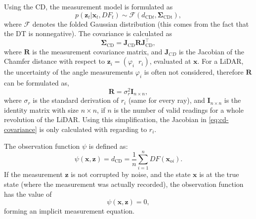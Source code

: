 Using the CD, the measurement model is formulated as
\begin{equation}
    p(\mathbf{\mathbf{z}}_t | \mathbf{x}_t, DF_t) \sim \mathcal{F}(d_{\text{CD}t},\boldsymbol\Sigma_{\text{CDt}}),
\end{equation}
where $\mathcal{F}$ denotes the folded Gaussian distribution (this comes from the fact that the DT is nonnegative).
The covariance is calculated as
\begin{equation}\label{eq:cd-covariance}
    \boldsymbol\Sigma_{\text{CD}} = \mathbf{J}_{\text{CD}}\mathbf{R}\mathbf{J}_{\text{CD}}^{\top},
\end{equation}
where $\mathbf{R}$ is the measurement covariance matrix, and $\mathbf{J}_{CD}$ is the Jacobian of the
Chamfer distance with respect to $\mathbf{z}_i = (\varphi_i\;\;r_i)$,
evaluated at $\mathbf{x}$.
For a LiDAR, the uncertainty of the angle measurements $\varphi_i$ is often not considered,
therefore $\mathbf{R}$ can be formulated as,
\begin{equation}\label{eq:lidar-meas-covar}
    \mathbf{R} = \sigma_r^{2}\mathbf{I}_{n\times n},
\end{equation}
where $\sigma_r$ is the standard derivation of $r_i$ (same for every ray),
and $\mathbf{I}_{n\times n}$ is the identity matrix with size $n\times n$,
if $n$ is the number of valid readings for a whole revolution of the LiDAR.
Using this simplification, the Jacobian in \eqref{eq:cd-covariance}
is only calculated with regarding to $r_i$.

The observation function $\psi$ is defined as:
\begin{equation}\label{eq:observation-function}
    \psi(\mathbf{x},\mathbf{z}) = d_{\text{CD}} = \frac{1}{n}\sum_{i=1}^{n}DF(\mathbf{x}_{\text{o}i}).
\end{equation}
If the measurement $\mathbf{z}$ is not corrupted by noise, and the state $\mathbf{x}$
is at the true state (where the measurement was actually recorded), the observation
function has the value of
\begin{equation}\label{eq:impl-meas-eq}
    \psi(\mathbf{x},\mathbf{z}) = 0,
\end{equation}
forming an implicit measurement equation.


